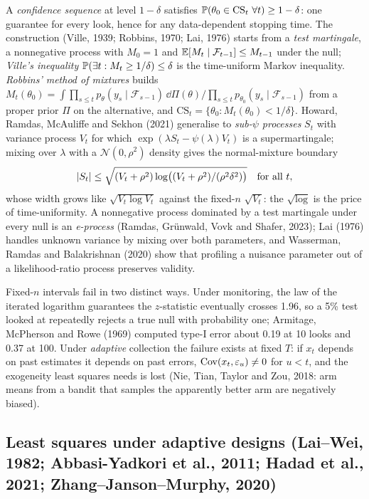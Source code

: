 A \emph{confidence sequence} at level $1 - \delta$ satisfies $\Prob(\theta_0 \in \mathrm{CS}_t\ \forall t) \ge 1 - \delta$: one guarantee for every look, hence for any data-dependent stopping time. The construction (Ville, 1939; Robbins, 1970; Lai, 1976) starts from a \emph{test martingale}, a nonnegative process with $M_0 = 1$ and $\mathbb{E}[M_t \mid \mathcal F_{t-1}] \le M_{t-1}$ under the null; \emph{Ville's inequality} $\mathbb{P}(\exists t : M_t \ge 1/\delta) \le \delta$ is the time-uniform Markov inequality. \emph{Robbins' method of mixtures} builds $M_t(\theta_0) = \int\prod_{s \le t}p_\theta(y_s \mid \mathcal F_{s-1})\,\dd\Pi(\theta)\big/\prod_{s \le t}p_{\theta_0}(y_s \mid \mathcal F_{s-1})$ from a proper prior $\Pi$ on the alternative, and $\mathrm{CS}_t = \{\theta_0 : M_t(\theta_0) < 1/\delta\}$. Howard, Ramdas, McAuliffe and Sekhon (2021) generalise to \emph{sub-$\psi$ processes} $S_t$ with variance process $V_t$ for which $\exp(\lambda S_t - \psi(\lambda)V_t)$ is a supermartingale; mixing over $\lambda$ with a $\mathcal N(0, \rho^2)$ density gives the normal-mixture boundary
\begin{equation}
\left|S_t\right| \le \sqrt{(V_t + \rho^2)\log\!\big((V_t + \rho^2)/(\rho^2\delta^2)\big)}\quad\text{for all } t,
\label{eq:fb:mixture}
\end{equation}
whose width grows like $\sqrt{V_t\log V_t}$ against the fixed-$n$ $\sqrt{V_t}$: the $\sqrt{\log}$ is the price of time-uniformity. A nonnegative process dominated by a test martingale under every null is an \emph{e-process} (Ramdas, Gr\"unwald, Vovk and Shafer, 2023); Lai (1976) handles unknown variance by mixing over both parameters, and Wasserman, Ramdas and Balakrishnan (2020) show that profiling a nuisance parameter out of a likelihood-ratio process preserves validity.

Fixed-$n$ intervals fail in two distinct ways. Under monitoring, the law of the iterated logarithm guarantees the $z$-statistic eventually crosses 1.96, so a 5\% test looked at repeatedly rejects a true null with probability one; Armitage, McPherson and Rowe (1969) computed type-I error about 0.19 at 10 looks and 0.37 at 100. Under \emph{adaptive} collection the failure exists at fixed $T$: if $x_t$ depends on past estimates it depends on past errors, $\operatorname{Cov}(x_t, \varepsilon_u) \ne 0$ for $u < t$, and the exogeneity least squares needs is lost (Nie, Tian, Taylor and Zou, 2018: arm means from a bandit that samples the apparently better arm are negatively biased).

\subsection{Least squares under adaptive designs (Lai--Wei, 1982; Abbasi-Yadkori et al., 2011; Hadad et al., 2021; Zhang--Janson--Murphy, 2020)}

